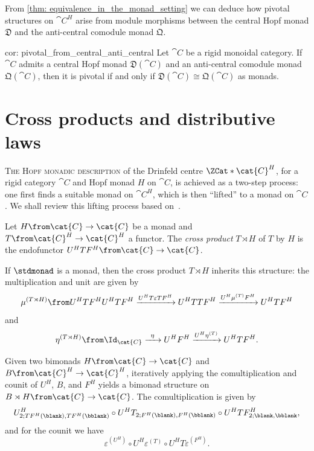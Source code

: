 From \cref{thm: equivalence_in_the_monad_setting} we can deduce how pivotal structures on \(\cat{C}^H\) arise from module morphisms
between the central Hopf monad \(\mathfrak{D}\) and the anti\hyp{}central comodule monad \(\mathfrak{Q}\).

\begin{reptheorem}{cor: pivotal_from_central_anti_central}
  Let \(\cat{C}\) be a rigid monoidal category.
  If \(\cat{C}\) admits a central Hopf monad \(\mathfrak{D}(\cat{C})\)
  and an anti\hyp{}central comodule monad \(\mathfrak{Q}(\cat{C})\),
  then it is pivotal if and only if \(\mathfrak{D}(\cat{C}) \cong \mathfrak{Q}(\cat{C})\) as monads.
\end{reptheorem}

\section{Cross products and distributive laws}\label{sec:cross_products_and_distributive_laws}

\textsc{The Hopf monadic description}
of the Drinfeld centre \(\ZCat*{\cat{C}^H}\), for a rigid category \(\cat{C}\) and Hopf monad \(H\) on \(\cat{C}\),
is achieved as a two-step process:
one first finds a suitable monad on \(\cat{C}^H\), which is then ``lifted'' to a monad on \(\cat{C}\).
We shall review this lifting process based on~\cite[Sections~3 and~4]{Bruguieres2012}.

\begin{definition}\label{def: crossed_product_monad}
  Let \(H\from \cat{C} \to \cat{C}\) be a monad
  and \(T \from \cat{C}^H \to \cat{C}^H\) a functor.
  The \emph{cross product} \(T\rtimes H\) of \(T\) by \(H\) is the endofunctor
  \(U^H T F^H \from \cat{C} \to \cat{C}\).
\end{definition}

If \(\stdmonad\) is a monad, then the cross product \(T \rtimes H\) inherits this structure:
the multiplication and unit are given by
\[
  \mu^{(T \rtimes H)}\from
  U^H T F^H U^H T F^H
  \xrightarrow{U^H T \varepsilon TF^H} U^H T T F^H
  \xrightarrow{U^H \mu^{(T)}F^H} U^H T F^H
\]
and
\[
  \eta^{(T \rtimes H)}\from \Id_{\cat{C}}
  \xrightarrow{\;\;\eta\;\;} U^H F^H
  \xrightarrow{U^H \eta^{(T)}} U^H T F^H.
\]

Given two bimonads \(H \from \cat{C} \to \cat{C}\) and \(B \from \cat{C}^H \to \cat{C}^H\),
iteratively applying
the comultiplication and counit of \(U^H\), \(B\), and \(F^H\)
yields a bimonad structure on \(B \rtimes H \from \cat{C} \to \cat{C}\).
The comultiplication is given by
\[
  U^H_{2; TF^H(\blank), TF^H(\bblank)} \circ U^H T_{2; F^H(\blank), F^H(\bblank)} \circ U^H T F^H_{2; \blank, \bblank},
\]
and for the counit we have
\[
  \varepsilon^{(U^H)} \circ U^H \varepsilon^{(T)} \circ U^H T \varepsilon^{(F^H)}.
\]

